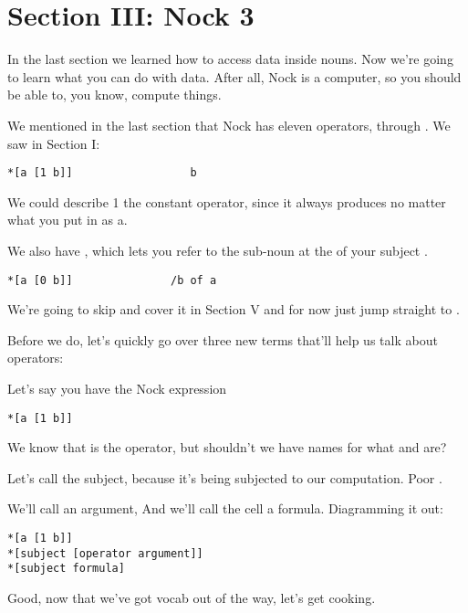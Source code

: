 \section{Section III: Nock 3}

In the last section we learned how to access data inside nouns. Now we're going
to learn what you can do with data. After all, Nock is a computer, so you
should be able to, you know, compute things.

We mentioned in the last section that Nock has eleven operators,  through
. We saw  in Section I:
\begin{framed_shaded}
\begin{Verbatim}[fontsize=\relsize{-2.5},fontseries=b,commandchars=\\\{\}]
*[a [1 b]]                  b
\end{Verbatim}
\end{framed_shaded}
We could describe 1 the constant operator, since it always produces 
no matter what you put in as a.

We also have , which lets you refer to the sub-noun at the  of
your subject . 
\begin{framed_shaded}
\begin{Verbatim}[fontsize=\relsize{-2.5},fontseries=b,commandchars=\\\{\}]
*[a [0 b]]               /b of a
\end{Verbatim}
\end{framed_shaded}
We're going to skip  and cover it in Section V and for now just jump
straight to .

Before we do, let's quickly go over three new terms that'll help us talk about
operators:

Let's say you have the Nock expression 
\begin{framed_shaded}
\begin{Verbatim}[fontsize=\relsize{-2.5},fontseries=b,commandchars=\\\{\}]
*[a [1 b]] 
\end{Verbatim}
\end{framed_shaded}
We know that  is the operator, but shouldn't we have names for what  and
 are?

Let's call  the subject, because it's being subjected to our computation.
Poor .

We'll call  an argument, And we'll call the cell \kode{[1 b]} a formula.
Diagramming it out:
\begin{framed_shaded}
\begin{Verbatim}[fontsize=\relsize{-2.5},fontseries=b,commandchars=\\\{\}]
*[a [1 b]] 
*[subject [operator argument]]
*[subject formula]
\end{Verbatim}
\end{framed_shaded}
Good, now that we've got vocab out of the way, let's get cooking.

